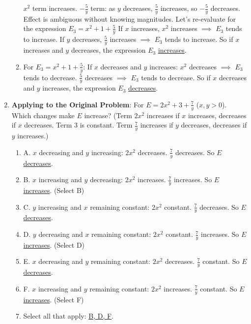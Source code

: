 \documentclass[12pt]{article}
\begin{document}
\begin{enumerate}[label=32.\arabic*]
\begin{enumerate}[label=\alph*)]
        \(x^2\) term increases. \(-\frac{5}{y}\) term: as \(y\) decreases, \(\frac{5}{y}\) increases, so \(-\frac{5}{y}\) decreases.
        Effect is ambiguous without knowing magnitudes.
        Let's re-evaluate for the expression \(E_3 = x^2 + 1 + \frac{5}{y}\)
        If \(x\) increases, \(x^2\) increases \(\implies\) \(E_3\) tends to increase.
        If \(y\) decreases, \(\frac{5}{y}\) increases \(\implies\) \(E_3\) tends to increase.
        So if \( x \) increases and \( y \) decreases, the expression \(E_3\) \underline{increases}.
        \item For \(E_3 = x^2 + 1 + \frac{5}{y}\): If \( x \) decreases and \( y \) increases:
        \(x^2\) decreases \(\implies\) \(E_3\) tends to decrease.
        \(\frac{5}{y}\) decreases \(\implies\) \(E_3\) tends to decrease.
        So if \( x \) decreases and \( y \) increases, the expression \(E_3\) \underline{decreases}.
    \end{enumerate}
    \item \textbf{Applying to the Original Problem}: For \( E = 2x^2 + 3 + \frac{7}{y} \) (\(x, y > 0\)). Which changes make \(E\) increase?
    (Term \(2x^2\) increases if \(x\) increases, decreases if \(x\) decreases. Term \(3\) is constant. Term \(\frac{7}{y}\) increases if \(y\) decreases, decreases if \(y\) increases.)
    \begin{enumerate}[label=\alph*)]
        \item A. \( x \) decreasing and \( y \) increasing:
        \(2x^2\) decreases. \(\frac{7}{y}\) decreases. So \(E\) \underline{decreases}.
        \item B. \( x \) increasing and \( y \) decreasing:
        \(2x^2\) increases. \(\frac{7}{y}\) increases. So \(E\) \underline{increases}. (Select B)
        \item C. \( y \) increasing and \( x \) remaining constant:
        \(2x^2\) constant. \(\frac{7}{y}\) decreases. So \(E\) \underline{decreases}.
        \item D. \( y \) decreasing and \( x \) remaining constant:
        \(2x^2\) constant. \(\frac{7}{y}\) increases. So \(E\) \underline{increases}. (Select D)
        \item E. \( x \) decreasing and \( y \) remaining constant:
        \(2x^2\) decreases. \(\frac{7}{y}\) constant. So \(E\) \underline{decreases}.
        \item F. \( x \) increasing and \( y \) remaining constant:
        \(2x^2\) increases. \(\frac{7}{y}\) constant. So \(E\) \underline{increases}. (Select F)
        \item Select all that apply: \underline{B, D, F}.
    \end{enumerate}
\end{enumerate}
\end{document}
